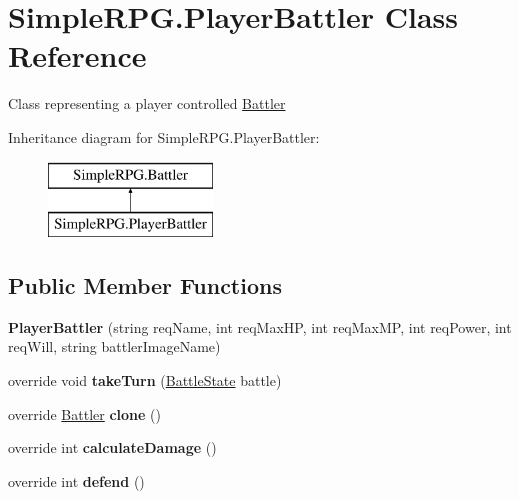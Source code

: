 \hypertarget{class_simple_r_p_g_1_1_player_battler}{\section{Simple\-R\-P\-G.\-Player\-Battler Class Reference}
\label{class_simple_r_p_g_1_1_player_battler}
}


Class representing a player controlled \hyperlink{class_simple_r_p_g_1_1_battler}{Battler}  


Inheritance diagram for Simple\-R\-P\-G.\-Player\-Battler\-:\begin{figure}[H]
\begin{center}
\leavevmode
\includegraphics[height=2.000000cm]{class_simple_r_p_g_1_1_player_battler}
\end{center}
\end{figure}
\subsection*{Public Member Functions}
\begin{DoxyCompactItemize}
\item 
\hypertarget{class_simple_r_p_g_1_1_player_battler_a61e46dcd1e72f97258e1f497c2aab7fe}{{\bfseries Player\-Battler} (string req\-Name, int req\-Max\-H\-P, int req\-Max\-M\-P, int req\-Power, int req\-Will, string battler\-Image\-Name)}\label{class_simple_r_p_g_1_1_player_battler_a61e46dcd1e72f97258e1f497c2aab7fe}

\item 
\hypertarget{class_simple_r_p_g_1_1_player_battler_ab2af3f0b8a0f15789a9d5cbd85c2789a}{override void {\bfseries take\-Turn} (\hyperlink{class_simple_r_p_g_1_1_states_1_1_battle_state}{Battle\-State} battle)}\label{class_simple_r_p_g_1_1_player_battler_ab2af3f0b8a0f15789a9d5cbd85c2789a}

\item 
\hypertarget{class_simple_r_p_g_1_1_player_battler_a148370f2caa6bd04f9d144d54c829d89}{override \hyperlink{class_simple_r_p_g_1_1_battler}{Battler} {\bfseries clone} ()}\label{class_simple_r_p_g_1_1_player_battler_a148370f2caa6bd04f9d144d54c829d89}

\item 
\hypertarget{class_simple_r_p_g_1_1_player_battler_adc2faffae03f1c60fff67d432b6cfb2a}{override int {\bfseries calculate\-Damage} ()}\label{class_simple_r_p_g_1_1_player_battler_adc2faffae03f1c60fff67d432b6cfb2a}

\item 
\hypertarget{class_simple_r_p_g_1_1_player_battler_ae1aac76d4eab4bceaf58d890ad9b94a4}{override int {\bfseries defend} ()}\label{class_simple_r_p_g_1_1_player_battler_ae1aac76d4eab4bceaf58d890ad9b94a4}

\end{DoxyCompactItemize}
